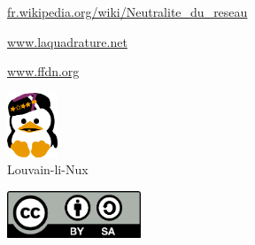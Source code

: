 \documentclass[a4paper,11pt,sf]{leaflet}
\begin{document}
\url{fr.wikipedia.org/wiki/Neutralite_du_reseau}

\url{www.laquadrature.net}

\url{www.ffdn.org}

\vspace*{\fill}
\begin{minipage}{.3\textwidth}
  \centering
  \includegraphics[width=1.5cm]{llnux} \\
  Louvain-li-Nux
\end{minipage}%
\hfill
\begin{minipage}{0.5\textwidth}
  \hfill
  \includegraphics[width=4cm]{cc-by-sa}
\end{minipage}
\end{document}
